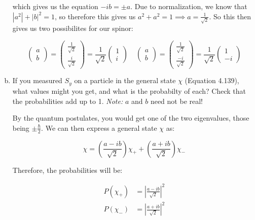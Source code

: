 \documentclass[10pt]{article}
\begin{document}
\begin{enumerate}[(a)]
\begin{solution}
            which gives us the equation $-ib = \pm a$. Due to normalization, we know that $|a^2| + |b|^2 = 1$, so therefore this gives us $a^2 + a^2 = 1 \implies a = \frac{1}{\sqrt{2}}$. So this then gives us two possibilites for our spinor: 

            \[ \begin{pmatrix}
                a \\ b
            \end{pmatrix} = \begin{pmatrix}
                \frac{1}{\sqrt 2} \\
                \frac{i}{\sqrt 2}
            \end{pmatrix} = \frac{1}{\sqrt{2}} \begin{pmatrix}
                1\\i
            \end{pmatrix}\phantom{aa} \begin{pmatrix}
                a \\ b
            \end{pmatrix} = \begin{pmatrix}
                \frac{1}{\sqrt 2} \\
                \frac{-i}{\sqrt{2}}
            \end{pmatrix} = \frac{1}{\sqrt{2}}\begin{pmatrix}
                1 \\ -i
            \end{pmatrix} \]
        \end{solution}
        \item If you measured $S_y$ on a particle in the general state $\chi$ (Equation 4.139), what values might you get, and what is the probabilty of each? Check that the probabilities add up to 1. \textit{Note:} $a$ and $b$ need not be real!
        
        \begin{solution}
            By the quantum postulates, you would get one of the two eigenvalues, those being $\pm \frac{\hbar}{2}$. We can then express a general state $\chi$ as: 

            \[ \chi = \left(\frac{a - ib}{\sqrt 2}\right) \chi_+ + \left(\frac{a + ib}{\sqrt 2}\right)\chi_-\]

            Therefore, the probabilities will be: 

            \begin{align*}
                P(\chi_+) &= \left|\frac{a - ib}{\sqrt 2}\right|^2 \\
                P(\chi_-) &= \left|\frac{a + ib}{\sqrt 2}\right|^2
            \end{align*}


\end{solution}
\end{enumerate}
\end{document}
